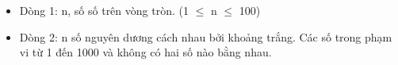 \begin{itemize}
	\item     Dòng 1: n, số số trên vòng tròn. (1 $\le$ n $\le$ 100)   
	\item     Dòng 2: n số nguyên dương cách nhau bởi khoảng trắng. Các số trong phạm vi từ 1 đến 1000 và không có hai số nào bằng nhau.   
\end{itemize}

\